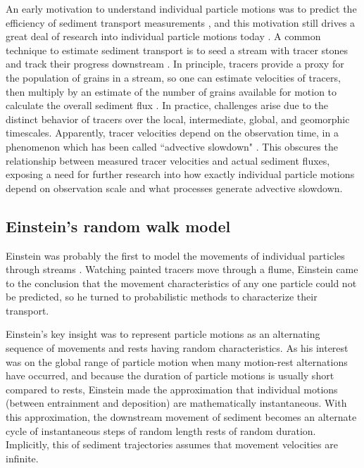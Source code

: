 \DIFaddend An early motivation to understand individual particle motions was to predict the efficiency of sediment transport measurements \citep{Ettema2004}, and this motivation still drives a great deal of research into individual particle motions today \citep{Hassan2017,Pretzlav2021}.
A common technique to estimate sediment transport is to seed a stream with tracer stones and track their progress downstream \citep{Einstein1937, Takayama1965, Pretzlav2021}.
In principle, tracers provide a proxy for the population of grains in a stream, so one can estimate \DIFdelbegin {}\DIFdelend \DIFaddbegin {}\DIFaddend velocities of tracers, then multiply by an estimate of the number of grains available for motion to calculate the overall sediment flux \citep{Wilcock1997a,Ferguson2002}.
In practice, challenges arise due to the distinct behavior of tracers over the local, intermediate, global, and geomorphic timescales. Apparently, tracer \DIFaddbegin {}\DIFaddend velocities depend on the observation time, in a phenomenon which has been called ``advective slowdown" \citep{Ferguson2002,Haschenburger2011, Haschenburger2013, Pelosi2016}. This \DIFaddbegin {}\DIFaddend obscures the relationship between measured tracer \DIFaddbegin {}\DIFaddend velocities and actual sediment fluxes, exposing a need for further research into how exactly individual particle motions depend on observation scale and what processes generate advective slowdown.

\subsection{Einstein's random walk model}
\label{sec:einwalk}
Einstein was probably the first to model the movements of individual particles through streams \citep{Einstein1937}.
Watching painted tracers move through a flume, Einstein came to the conclusion that the movement characteristics of any one particle could not be predicted, so he turned to probabilistic methods to characterize their transport.

Einstein's key insight was to represent particle motions as an alternating sequence of movements and rests having random characteristics.
As his interest was on the global range of particle motion when many motion-rest alternations have occurred, and because the duration of particle motions is usually short compared to rests, Einstein made the approximation that individual motions (between entrainment and deposition) are mathematically instantaneous.
With this approximation, the downstream movement of sediment becomes an alternate cycle of instantaneous steps of random length \DIFdelbegin {}\DIFdelend \DIFaddbegin {}\DIFaddend rests of random duration. 
Implicitly, this \DIFdelbegin {}\DIFdelend \DIFaddbegin {}\DIFaddend of sediment trajectories assumes that movement velocities are infinite.

